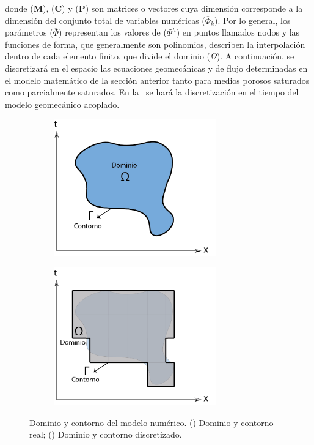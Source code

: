donde ($\mathbf{M}$), ($\mathbf{C}$) y ($\mathbf{P}$) son matrices o vectores cuya dimensión corresponde a la dimensión del conjunto total de variables numéricas ($\overline{\Phi}_k$). Por lo general, los parámetros ($\overline{\Phi}$) representan los valores de ($\Phi^h$) en puntos llamados nodos y las funciones de forma, que generalmente son polinomios, describen la interpolación dentro de cada elemento finito, que divide el dominio ($\Omega$). A continuación, se discretizará en el espacio las ecuaciones geomecánicas y de flujo determinadas en el modelo matemático de la sección anterior tanto para medios porosos saturados como parcialmente saturados. En la~ se hará la discretización en el tiempo del modelo geomecánico acoplado.\bigskip



\begin{figure}[!ht]
\centering
\begin{subfigure}[b]{.45\textwidth}
        \centering
        \includegraphics[width=7cm]{Imagenes/Kap_03/Dominio_Real.png}
        \caption{}
        \label{fig:fig36a}
\end{subfigure}
\hfill
\begin{subfigure}[b]{.45\textwidth}
        \centering
        \includegraphics[width=7cm]{Imagenes/Kap_03/Dominio_FEM.png}
        \caption{}
        \label{fig:fig36b}
\end{subfigure}
\captionsetup{format=plain}
\caption[Dominio y contorno del modelo numérico]{Dominio y contorno del modelo numérico. () Dominio y contorno real; () Dominio y contorno discretizado.} 
\label{fig:fig36}
\end{figure}



